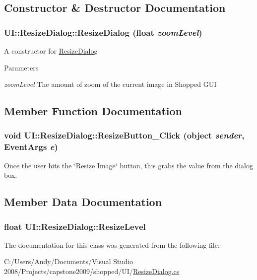 \subsection{Constructor \& Destructor Documentation}
\hypertarget{class_u_i_1_1_resize_dialog_ada896a290881c73569c3ce7570bf45c7}{
\subsubsection[{ResizeDialog}]{\setlength{\rightskip}{0pt plus 5cm}UI::ResizeDialog::ResizeDialog (float {\em zoomLevel})}}
\label{class_u_i_1_1_resize_dialog_ada896a290881c73569c3ce7570bf45c7}
A constructor for \hyperlink{class_u_i_1_1_resize_dialog}{ResizeDialog}


\begin{DoxyParams}{Parameters}
\item[{\em zoomLevel}]The amount of zoom of the current image in Shopped GUI \end{DoxyParams}


\subsection{Member Function Documentation}
\hypertarget{class_u_i_1_1_resize_dialog_a8bd7462ff2288c8e77d91e3197729ccc}{
\subsubsection[{ResizeButton\_\-Click}]{\setlength{\rightskip}{0pt plus 5cm}void UI::ResizeDialog::ResizeButton\_\-Click (object {\em sender}, \/  EventArgs {\em e})}}
\label{class_u_i_1_1_resize_dialog_a8bd7462ff2288c8e77d91e3197729ccc}
Once the user hits the \char`\"{}Resize Image\char`\"{} button, this grabs the value from the dialog box. 

\subsection{Member Data Documentation}
\hypertarget{class_u_i_1_1_resize_dialog_af8b6b6d17d8ca70b6721793ca833f7e9}{
\subsubsection[{ResizeLevel}]{\setlength{\rightskip}{0pt plus 5cm}float {\bf UI::ResizeDialog::ResizeLevel}}}
\label{class_u_i_1_1_resize_dialog_af8b6b6d17d8ca70b6721793ca833f7e9}


The documentation for this class was generated from the following file:\begin{DoxyCompactItemize}
\item 
C:/Users/Andy/Documents/Visual Studio 2008/Projects/capstone2009/shopped/UI/\hyperlink{_resize_dialog_8cs}{ResizeDialog.cs}\end{DoxyCompactItemize}
